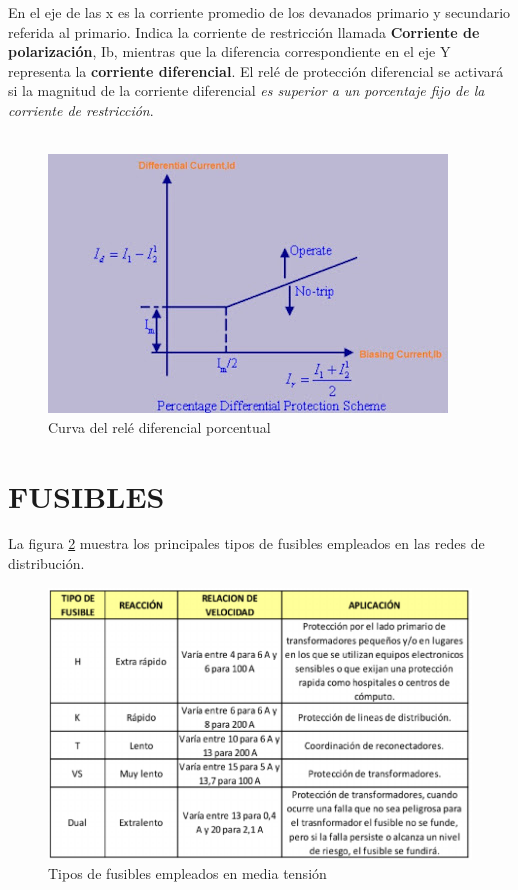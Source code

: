 \documentclass[a5paper]{book}%
\begin{document}
En el eje de las x es la corriente promedio de los devanados primario y secundario referida al primario. Indica la corriente de restricción llamada \textbf{Corriente de polarización}, Ib, mientras que la diferencia correspondiente en el eje Y representa la \textbf{corriente diferencial}. El relé de protección diferencial se activará si la magnitud de la corriente diferencial \textit{es superior a un porcentaje fijo de la corriente de restricción}.\\\\

\begin{figure}[H]
	\centering  
	\caption{Curva del relé diferencial porcentual}
	\label{fig:proteccionestrafo}
	\includegraphics[width=\linewidth]{Proteccion-Diferencial-Porcentual}
\end{figure}



\section{FUSIBLES}

La figura \ref{fig:tiposfusibles} muestra  los principales tipos de fusibles empleados en las redes de distribución.

\begin{figure}[H]
	\centering
	\includegraphics[width=0.7\linewidth]{tipos_fusibles}
	\caption{Tipos de fusibles empleados en media tensión}
	\label{fig:tiposfusibles}
\end{figure}
\end{document}
